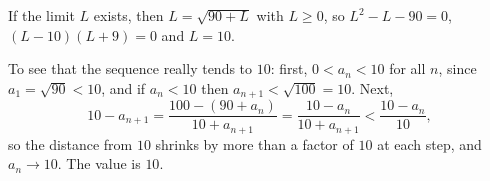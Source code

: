 If the limit $L$ exists, then $L=\sqrt{90+L}$ with $L\ge0$, so $L^2-L-90=0$, $(L-10)(L+9)=0$ and $L=10$.

To see that the sequence really tends to $10$: first, $0<a_n<10$ for all $n$, since $a_1=\sqrt{90}<10$, and if $a_n<10$ then $a_{n+1}<\sqrt{100}=10$. Next,
\[10-a_{n+1}=\dfrac{100-(90+a_n)}{10+a_{n+1}}=\dfrac{10-a_n}{10+a_{n+1}}<\dfrac{10-a_n}{10},\]
so the distance from $10$ shrinks by more than a factor of $10$ at each step, and $a_n\to10$. The value is $\boxed{10}$.
